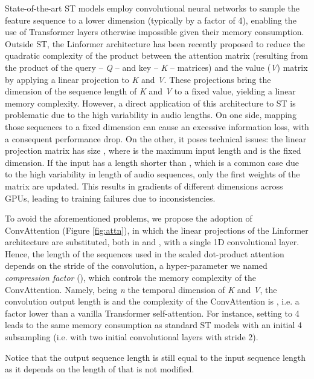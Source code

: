 \documentclass[11pt]{article}
\begin{document}
State-of-the-art ST models employ convolutional neural networks to sample the feature sequence to a lower dimension (typically by a factor of 4), enabling the use of Transformer layers otherwise impossible given their memory consumption. 
Outside ST, the Linformer architecture \cite{wang2020linformer} has been recently proposed to reduce
the quadratic complexity of the product between the attention matrix (resulting from the product of the query -- \textit{Q} -- and key -- \textit{K} -- matrices) and the value (\textit{V}) matrix by applying a linear projection to \textit{K} and \textit{V}.
These projections bring the dimension of the sequence length of \textit{K} and \textit{V} to a fixed value, yielding a linear memory complexity.
However, a direct application of this architecture to ST is problematic due to the high variability in audio lengths. 
On one side, mapping those sequences to a fixed dimension can cause an excessive information loss, with a consequent performance drop. 
On the other, it poses technical issues: the linear projection matrix has size , where  is the maximum input length and  is the fixed dimension.
If the input has a length  shorter than , which is a common case due to the high variability in length of audio sequences, only the first  weights of the matrix are updated. This results in gradients of different dimensions across GPUs, leading to training failures due to inconsistencies.

To avoid the aforementioned problems, we propose the adoption of ConvAttention (Figure \ref{fig:attn}), in which the linear projections of the Linformer architecture are substituted, both in  and , with a single 1D convolutional layer.
Hence, the length of the sequences used in the scaled dot-product attention depends on the stride of the convolution, a hyper-parameter we named \textit{compression factor} (), which controls the memory complexity of the ConvAttention.
Namely, being \textit{n} the temporal dimension of \textit{K} and \textit{V}, the convolution output length is  and
the complexity of the ConvAttention is , i.e. a  factor lower than a vanilla Transformer self-attention. 
For instance, setting  to 4 leads to 
the same memory consumption
as standard ST models with an initial 4 subsampling (i.e. with two initial convolutional layers with stride 2).

Notice that the output sequence length is still equal to the input sequence length as it depends on the length of  that is not modified. 
\end{document}
